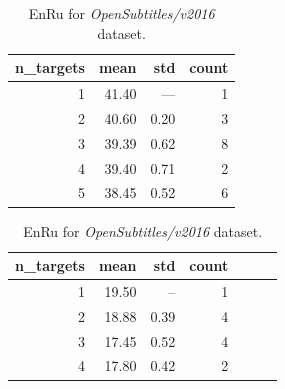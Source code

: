 \begin{table}[h!]
\begin{subtable}[t]{0.45\linewidth}
	\centering
	\begin{tabular}{rrrr}
	\toprule
	n\_targets &   mean &   std & count \\
	\midrule
	         1 &  41.40 &  ---  &   1 \\
	         2 &  40.60 &  0.20 &   3 \\
	         3 &  39.39 &  0.62 &   8 \\
	         4 &  39.40 &  0.71 &   2 \\
	         5 &  38.45 &  0.52 &   6 \\
	\bottomrule
	\end{tabular}

	\caption{
		En\to{}Bg for \emph{Europarl/v7} dataset.
		}
	\label{tab:bg/Europarl/v7}
\end{subtable}
\begin{subtable}[t]{0.45\linewidth}
	\centering
	\begin{tabular}{rrrrrrr}
	\toprule
	n\_targets &      mean &  std & count \\
	\midrule
	        1  &     19.50 &  --  &     1 \\
	        2  &     18.88 & 0.39 &     4 \\
	        3  &     17.45 & 0.52 &     4 \\
	        4  &     17.80 & 0.42 &     2 \\
	\bottomrule
	\end{tabular}
	
	\caption{
		En\to{}Ru for \emph{OpenSubtitles/v2016} dataset.
		}
	\label{ table:ru/OpenSubtitles/v2016 }
\end{subtable}
\end{table}



% 


